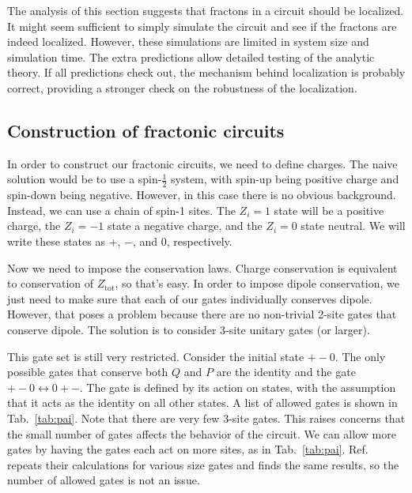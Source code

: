 \documentclass[a4paper,12pt]{article}
\renewcommand{\th}[1]{\frac{1}{#1}}
\begin{document}
The analysis of this section suggests that fractons in a circuit should be localized. It might seem sufficient to simply simulate the circuit and see if the fractons are indeed localized. However, these simulations are limited in system size and simulation time. The extra predictions allow detailed testing of the analytic theory. If all predictions check out, the mechanism behind localization is probably correct, providing a stronger check on the robustness of the localization.

\subsection{Construction of fractonic circuits} \label{sub:construct}

In order to construct our fractonic circuits, we need to define charges. The naive solution would be to use a spin-$\th{2}$ system, with spin-up being positive charge and spin-down being negative. However, in this case there is no obvious background. Instead, we can use a chain of spin-1 sites. The $Z_i=1$ state will be a positive charge, the $Z_i=-1$ state a negative charge, and the $Z_i=0$ state neutral. We will write these states as +, $-$, and 0, respectively.

Now we need to impose the conservation laws. Charge conservation is equivalent to conservation of $Z_\text{tot}$, so that's easy. In order to impose dipole conservation, we just need to make sure that each of our gates individually conserves dipole. However, that poses a problem because there are no non-trivial 2-site gates that conserve dipole. The solution is to consider 3-site unitary gates (or larger).

This gate set is still very restricted. Consider the initial state $+-0$. The only possible gates that conserve both $Q$ and $P$ are the identity and the gate $+-0\leftrightarrow 0+-$. The gate is defined by its action on states, with the assumption that it acts as the identity on all other states. A list of allowed gates is shown in Tab.~\ref{tab:pai}. Note that there are very few 3-site gates. This raises concerns that the small number of gates affects the behavior of the circuit. We can allow more gates by having the gates each act on more sites, as in Tab.~\ref{tab:pai}. Ref.~\cite{PaiFracton} repeats their calculations for various size gates and finds the same results, so the number of allowed gates is not an issue.

\end{document}
